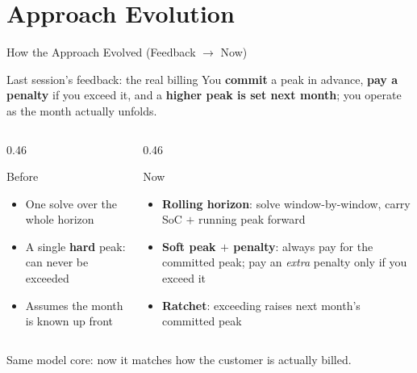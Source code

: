 \documentclass[aspectratio=169]{beamer}
\begin{document}
\section{Approach Evolution}

\begin{frame}{How the Approach Evolved (Feedback $\rightarrow$ Now)}
\begin{block}{Last session's feedback: the real billing}
\footnotesize
You \textbf{commit} a peak in advance, \textbf{pay a penalty} if you exceed it, and a
\textbf{higher peak is set next month}; you operate as the month actually unfolds.
\end{block}
\begin{columns}[t]
\begin{column}{0.46\textwidth}
\begin{block}{Before}
\footnotesize
\begin{itemize}
    \item One solve over the whole horizon
    \item A single \textbf{hard} peak: can never be exceeded
    \item Assumes the month is known up front
\end{itemize}
\end{block}
\end{column}
\hspace{0.04\textwidth}
\begin{column}{0.46\textwidth}
\begin{block}{Now}
\footnotesize
\begin{itemize}
    \item \textbf{Rolling horizon}: solve window-by-window, carry SoC $+$ running peak forward
    \item \textbf{Soft peak $+$ penalty}: always pay for the committed peak; pay an \emph{extra} penalty only if you exceed it
    \item \textbf{Ratchet}: exceeding raises next month's committed peak
\end{itemize}
\end{block}
\end{column}
\end{columns}
\vspace{0.15cm}
{\footnotesize\centering Same model core: now it matches how the customer is actually billed.\par}
\end{frame}
\end{document}
